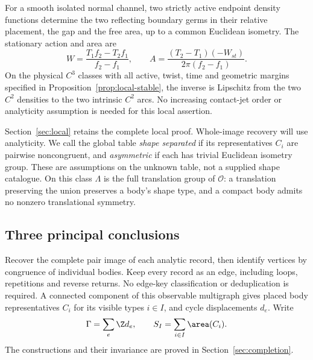 \begin{theorem}\label{thm:local-main}
For a smooth isolated normal channel, two strictly active endpoint
density functions determine the two reflecting boundary germs in their
relative placement, the gap and the free area, up to a common Euclidean
isometry. The stationary action and area are
\begin{equation}\label{eq:ratio-main}
 W=\frac{T_1f_2-T_2f_1}{f_2-f_1},\qquad
 A=\frac{(T_2-T_1)(-W_{st})}{2\pi(f_2-f_1)}.
\end{equation}
On the physical $C^3$ classes with all active, twist, time and geometric
margins specified in Proposition~\ref{prop:local-stable}, the inverse
is Lipschitz from the two $C^2$ densities to the two intrinsic $C^2$
arcs. No increasing contact-jet order or analyticity assumption is
needed for this local assertion.
\end{theorem}

Section~\ref{sec:local} retains the complete local proof. Whole-image
recovery will use analyticity. We call the global table \emph{shape
separated} if its representatives $C_i$ are pairwise noncongruent,
and \emph{asymmetric} if each has trivial Euclidean isometry group.
These are assumptions on the unknown table, not a supplied shape catalogue.
On this class $\Lambda$ is the full translation group of $\mathcal O$:
a translation preserving the union preserves a body's shape type, and
a compact body admits no nonzero translational symmetry.

\subsection{Three principal conclusions}
Recover the complete pair image of each analytic record, then identify
vertices by congruence of individual bodies. Keep every record as an
edge, including loops, repetitions and reverse returns. No edge-key
classification or deduplication is required. A connected component of
this observable multigraph gives placed body representatives $C_i$ for
its visible types $i\in I$, and cycle displacements $d_e$. Write
\[
 \Gamma=\sum_e\Z d_e,\qquad S_I=\sum_{i\in I}\area(C_i).
\]
The constructions and their invariance are proved in
Section~\ref{sec:completion}.

